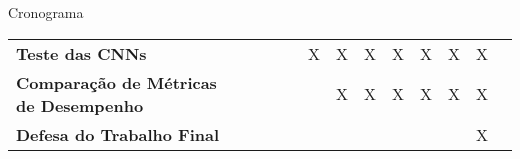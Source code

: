 \begin{frame}{Cronograma}
\begin{minipage}[b]{\linewidth}
\begin{table}
\begin{center}
\begin{small}
\begin{tabular}{p{5cm}cccccccccccc}
     \textbf{Teste das CNNs}               &             &             &             &             &      X      &      X      &      X      &      X      &      X      &      X       &     X      \\
     \textbf{Comparação de Métricas
     de Desempenho}                        &             &             &             &             &             &      X      &      X      &      X      &      X      &      X      &      X      \\
     \textbf{Defesa do Trabalho Final}     &             &             &             &             &             &             &             &             &             &             &      X      \\
     \bottomrule
   \end{tabular}
   \end{small}
   \end{center}
   \end{table}
\end{minipage}

\end{frame}
